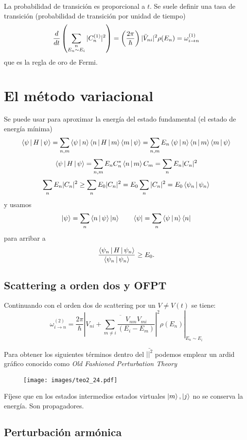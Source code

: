 \documentclass[10pt,oneside]{CBFT_book}
\begin{document}
La probabilidad de transición es proporcional a $t$. Se suele definir una tasa de transición (probabilidad de 
transición por unidad de tiempo)
\[
	\frac{d^{\hspace{-0.05em}} {}}{d {t}^{\hspace{-0.05em}}}\left( \sum_{\substack{n \\ E_n\sim E_i}} |C_n^{(1)}|^2 \right) =
	\left(\frac{2\pi}{\hbar}\right)	|\bar{V}_{ni}|^2 \rho(E_n) = \omega_{i\to n}^{(1)}
\]
que es la regla de oro de Fermi.

\section{El método variacional}

Se puede usar para aproximar la energía del estado fundamental (el estado de energía mínima)
\[
	\Braket{\psi|H|\psi} = \sum_{n,m}\Braket{\psi|n}\Braket{n|H|m}\Braket{m|\psi} =
		\sum_{n,m} E_n \Braket{\psi|n}\Braket{n|m}\Braket{m|\psi} 
\]
\[
	\Braket{\psi|H|\psi} = \sum_{n,m} E_n C_n^*\Braket{n|m}C_m = \sum_{n} E_n|C_n|^2
\]
\[
	\sum_{n} E_n|C_n|^2 \geq \sum_n E_0|C_n|^2 = E_0 \sum_n |C_n|^2 = E_0 \Braket{\psi_n|\psi_n}
\]
y usamos 
\[
\Ket{\psi} = \sum_n \Braket{n|\psi}\Ket{n} \qquad \Bra{\psi} = \sum_n \Braket{\psi|n}\Bra{n} 
\]
para arribar a
\[
	\frac{\Braket{\psi_n|H|\psi_n}}{\Braket{\psi_n|\psi_n}} \geq E_0.
\]

\subsection{Scattering a orden dos y OFPT}

Continuando con el orden dos de scattering por un $V\neq V(t)$ se tiene:
\[
	\omega_{i\to n}^{(2)} = \frac{2\pi}{\hbar}\left. \left| \overline{ V_{ni} + \sum_{m\neq i} 
	\frac{V_{nm}V_{mi}}{(E_i-E_m)}} \right|^2 \rho(E_n) \right|_{E_n\sim E_i}
\]

Para obtener los siguientes términos dentro del $\bar{||^2}$ podemos emplear un ardid gráfico conocido como 
{\it Old Fashioned Perturbation Theory}

\begin{figure}[!thb]
	\begin{center}
	\texttt{[image: images/teo2\_24.pdf]}
	\end{center}
	\caption{}
\end{figure} 


Fíjese que en los estados intermedios estados virtuales $\Ket{m},\Ket{j}$ no se conserva la energía. Son 
propagadores.


\subsection{Perturbación armónica}
\end{document}
